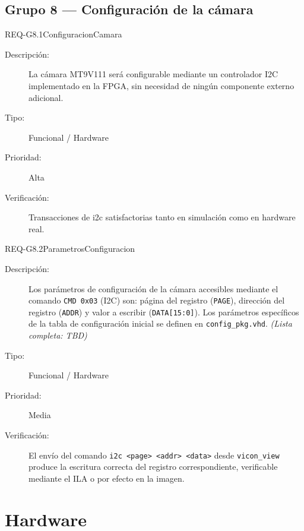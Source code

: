 \documentclass[../main.tex]{subfiles}
\begin{document}
\subsection{Grupo 8 — Configuración de la cámara}

\begin{requisito}{REQ-G8.1}{ConfiguracionCamara}
\begin{description}
    \item[Descripción:]   La cámara MT9V111 será configurable mediante un controlador I2C implementado en la FPGA, sin necesidad de ningún componente externo adicional.
    \item[Tipo:]          Funcional / Hardware
    \item[Prioridad:]     Alta
    \item[Verificación:]  Transacciones de i2c satisfactorias tanto en simulación como en hardware real.
\end{description}
\end{requisito}

\begin{requisito}{REQ-G8.2}{ParametrosConfiguracion}
\begin{description}
    \item[Descripción:]   Los parámetros de configuración de la cámara accesibles mediante el comando \texttt{CMD~0x03} (I2C) son: página del registro (\texttt{PAGE}), dirección del registro (\texttt{ADDR}) y valor a escribir (\texttt{DATA[15:0]}). Los parámetros específicos de la tabla de configuración inicial se definen en \texttt{config\_pkg.vhd}. \emph{(Lista completa: TBD)}
    \item[Tipo:]          Funcional / Hardware
    \item[Prioridad:]     Media
    \item[Verificación:]  El envío del comando \texttt{i2c <page> <addr> <data>} desde \texttt{vicon\_view} produce la escritura correcta del registro correspondiente, verificable mediante el ILA o por efecto en la imagen.
\end{description}
\end{requisito}

\section{Hardware}
\end{document}
